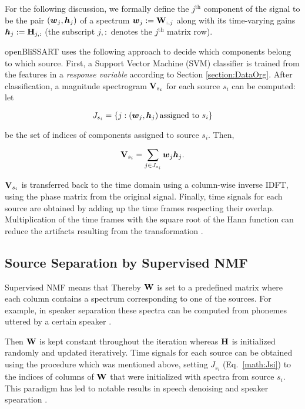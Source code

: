 For the following discussion, we formally define the $j^{\textrm{th}}$
component of the signal to be the pair $\left(\mbox{\boldmath$w$}_j, \mbox{\boldmath$h$}_j\right)$ of a
spectrum $\mbox{\boldmath$w$}_j := \mathbf{W}_{:,j}$ along with its time-varying gains
$\mbox{\boldmath$h$}_j := \mathbf{H}_{j,:}$ (the subscript $j,:$ denotes the $j^{\textrm{th}}$
matrix row).

openBliSSART uses the following approach to decide which components belong to which source. First, a Support Vector Machine (SVM) classifier is trained from the features in a {\em response variable} according to Section \ref{section:DataOrg}. After classification, a magnitude
spectrogram $\mathbf{V}_{s_i}$ for each source $s_i$ can be computed: let

\begin{equation}
    \label{math:Jsi}
    J_{s_i} = \left\{ j: \left(\mbox{\boldmath$w$}_j, \mbox{\boldmath$h$}_j\right) 
                         \mbox{assigned to } s_i \right\}
\end{equation}

\noindent be the set of indices of components assigned to source $s_i$. Then,

\begin{equation}
    \label{math:Vharm}
    \mathbf{V}_{s_i} = \sum\limits_{j \in J_{s_i}} \mbox{\boldmath$w$}_j \mbox{\boldmath$h$}_j .
\end{equation}

$\mathbf{V}_{s_i}$ is transferred back to the time domain using a column-wise
inverse IDFT, using the phase matrix from the original signal. Finally, time
signals for each source are obtained by adding up the time frames respecting
their overlap. Multiplication of the time frames with the square root of the Hann function can
reduce the artifacts resulting from the transformation \cite{Virtanen2005}.


\subsection{Source Separation by Supervised NMF}

\label{sec:nmfsss}

Supervised NMF means that Thereby $\mathbf{W}$ is
set to a predefined matrix where each column contains a spectrum corresponding
to one of the sources. For example, in speaker separation these spectra can be
computed from phonemes uttered by a certain speaker \cite{Schmidt2006}. 

Then $\mathbf{W}$ is kept constant throughout
the iteration whereas $\mathbf{H}$ is initialized randomly and updated
iteratively. Time
signals for each source can be obtained using the procedure which was mentioned
above, setting $J_{s_i}$ (Eq.~\ref{math:Jsi}) to the indices of columns of
$\mathbf{W}$ that were initialized with spectra from source $s_i$. This paradigm
has led to notable results in speech denoising \cite{Wilson2008_1,Wilson2008_2}
and speaker spearation \cite{Schmidt2006,Grady2007}. 


